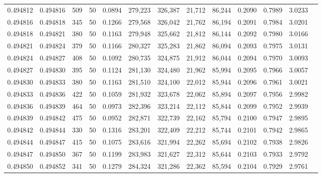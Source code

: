 \begin{tabular}{rrrrrrrrrrrrr}
0.494812 & 0.494816 &   509 &  50 &                                     0.0894 & 279,223 & 326,387 &  21,712 &  86,244 & 0.2090 & 0.7989 & 3.0233 \\
0.494816 & 0.494818 &   345 &  50 &                                     0.1266 & 279,568 & 326,042 &  21,762 &  86,194 & 0.2091 & 0.7984 & 3.0201 \\
0.494818 & 0.494821 &   380 &  50 &                                     0.1163 & 279,948 & 325,662 &  21,812 &  86,144 & 0.2092 & 0.7980 & 3.0166 \\
0.494821 & 0.494824 &   379 &  50 &                                     0.1166 & 280,327 & 325,283 &  21,862 &  86,094 & 0.2093 & 0.7975 & 3.0131 \\
0.494824 & 0.494827 &   408 &  50 &                                     0.1092 & 280,735 & 324,875 &  21,912 &  86,044 & 0.2094 & 0.7970 & 3.0093 \\
0.494827 & 0.494830 &   395 &  50 &                                     0.1124 & 281,130 & 324,480 &  21,962 &  85,994 & 0.2095 & 0.7966 & 3.0057 \\
0.494830 & 0.494833 &   380 &  50 &                                     0.1163 & 281,510 & 324,100 &  22,012 &  85,944 & 0.2096 & 0.7961 & 3.0021 \\
0.494833 & 0.494836 &   422 &  50 &                                     0.1059 & 281,932 & 323,678 &  22,062 &  85,894 & 0.2097 & 0.7956 & 2.9982 \\
0.494836 & 0.494839 &   464 &  50 &                                     0.0973 & 282,396 & 323,214 &  22,112 &  85,844 & 0.2099 & 0.7952 & 2.9939 \\
0.494839 & 0.494842 &   475 &  50 &                                     0.0952 & 282,871 & 322,739 &  22,162 &  85,794 & 0.2100 & 0.7947 & 2.9895 \\
0.494842 & 0.494844 &   330 &  50 &                                     0.1316 & 283,201 & 322,409 &  22,212 &  85,744 & 0.2101 & 0.7942 & 2.9865 \\
0.494844 & 0.494847 &   415 &  50 &                                     0.1075 & 283,616 & 321,994 &  22,262 &  85,694 & 0.2102 & 0.7938 & 2.9826 \\
0.494847 & 0.494850 &   367 &  50 &                                     0.1199 & 283,983 & 321,627 &  22,312 &  85,644 & 0.2103 & 0.7933 & 2.9792 \\
0.494850 & 0.494852 &   341 &  50 &                                     0.1279 & 284,324 & 321,286 &  22,362 &  85,594 & 0.2104 & 0.7929 & 2.9761 \\

\end{tabular}
